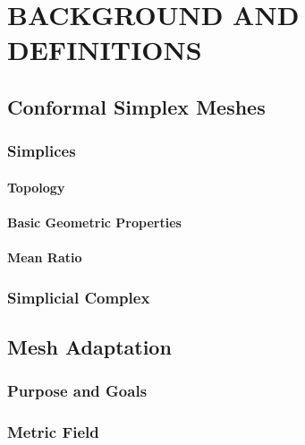 
\chapter{BACKGROUND AND DEFINITIONS}

\section{Conformal Simplex Meshes}

\subsection{Simplices}

\subsubsection{Topology}

\subsubsection{Basic Geometric Properties}

\subsubsection{Mean Ratio}

\subsection{Simplicial Complex}

\section{Mesh Adaptation}

\subsection{Purpose and Goals}

\subsection{Metric Field}

